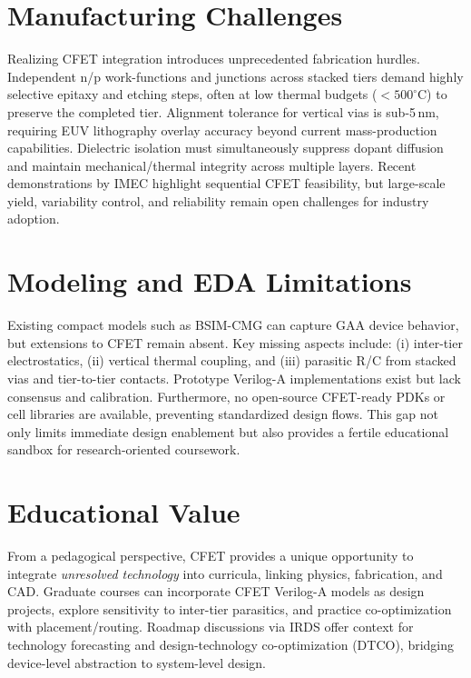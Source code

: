 \documentclass[conference]{IEEEtran}
\begin{document}
\section{Manufacturing Challenges}
Realizing CFET integration introduces unprecedented fabrication hurdles.
Independent n/p work-functions and junctions across stacked tiers demand highly selective epitaxy and etching steps, often at low thermal budgets ($<500^{\circ}$C) to preserve the completed tier.
Alignment tolerance for vertical vias is sub-5\,nm, requiring EUV lithography overlay accuracy beyond current mass-production capabilities.
Dielectric isolation must simultaneously suppress dopant diffusion and maintain mechanical/thermal integrity across multiple layers.
Recent demonstrations by IMEC \cite{imec_cfet_iedm2020} highlight sequential CFET feasibility, but large-scale yield, variability control, and reliability remain open challenges for industry adoption.

\section{Modeling and EDA Limitations}
Existing compact models such as BSIM-CMG \cite{bsimcmg_sispad2017} can capture GAA device behavior, but extensions to CFET remain absent.
Key missing aspects include: (i) inter-tier electrostatics, (ii) vertical thermal coupling, and (iii) parasitic R/C from stacked vias and tier-to-tier contacts.
Prototype Verilog-A implementations exist but lack consensus and calibration.
Furthermore, no open-source CFET-ready PDKs or cell libraries are available, preventing standardized design flows.
This gap not only limits immediate design enablement but also provides a fertile educational sandbox for research-oriented coursework.

\section{Educational Value}
From a pedagogical perspective, CFET provides a unique opportunity to integrate \emph{unresolved technology} into curricula, linking physics, fabrication, and CAD.
Graduate courses can incorporate CFET Verilog-A models as design projects, explore sensitivity to inter-tier parasitics, and practice co-optimization with placement/routing.
Roadmap discussions via IRDS \cite{irds_2023} offer context for technology forecasting and design-technology co-optimization (DTCO), bridging device-level abstraction to system-level design.
\end{document}
